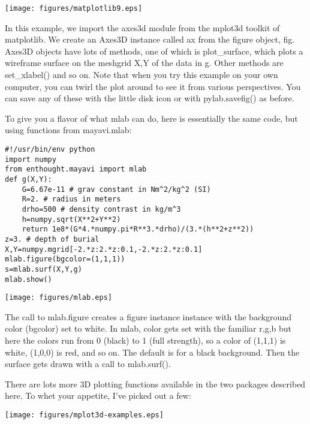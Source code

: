 \texttt{[image: figures/matplotlib9.eps]}

 In this example, we import the {\color{blue}axes3d} module from the {\color{blue}mplot3d} toolkit of {\color{blue}matplotlib}.  We create an {\color{blue}Axes3D} instance called {\color{blue}ax}  from the {\color{blue}figure} object,  {\color{blue}fig}.   {\color{blue}Axes3D} objects have lots of methods, one of which is  {\color{blue}plot\_surface}, which plots a wireframe surface on the meshgrid  {\color{blue}X,Y} of the data in  {\color{blue}g}.    Other methods are  {\color{blue}set\_xlabel()} and so on.   Note that when you try this example on your own computer, you can twirl the plot around to see it from various perspectives.  You can save any of these with the little disk icon or with  {\color{blue}pylab.savefig()} as before.   
 
 To give you a flavor of what  {\color{blue}mlab} can do,  here is essentially the same code, but using functions from {\color{blue}mayavi.mlab}: 
 
{\singlespacing \color{blue} \begin{verbatim}
#!/usr/bin/env python
import numpy
from enthought.mayavi import mlab
def g(X,Y):
    G=6.67e-11 # grav constant in Nm^2/kg^2 (SI)
    R=2. # radius in meters
    drho=500 # density contrast in kg/m^3
    h=numpy.sqrt(X**2+Y**2)
    return 1e8*(G*4.*numpy.pi*R**3.*drho)/(3.*(h**2+z**2))
z=3. # depth of burial
X,Y=numpy.mgrid[-2.*z:2.*z:0.1,-2.*z:2.*z:0.1]
mlab.figure(bgcolor=(1,1,1))
s=mlab.surf(X,Y,g)
mlab.show()
\end{verbatim}}


\texttt{[image: figures/mlab.eps]}

The call to  {\color{blue}mlab.figure} creates a figure instance instance with the background color (bgcolor) set to white.  In {\color{blue}mlab}, color gets set with the familiar r,g,b but here the colors run from 0 (black) to 1 (full strength), so a color of (1,1,1) is white, (1,0,0) is red, and so on.  The default is for a black background.  Then the surface gets drawn with a call to {\color{blue}mlab.surf()}.

There are lots more 3D plotting functions available in the two packages described here. To whet your appetite, I've picked out a few:  



\texttt{[image: figures/mplot3d-examples.eps]}





